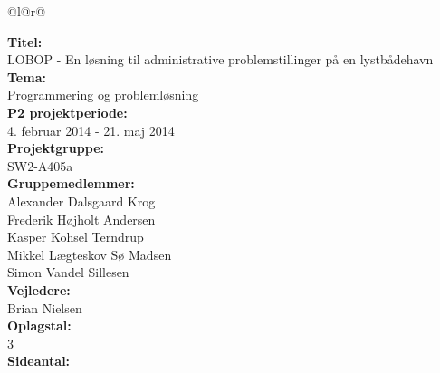 \pagestyle{titlepagestyle}

\newlength{\realparindent}
\newlength{\realparskip}
\setlength{\realparindent}{\parindent}
\setlength{\realparskip}{\parskip}

\begin{nopagebreak}
{\begin{center}
    \begin{tabular*}{\textwidth}{@{}l@{\extracolsep{\fill}}r@{}}
        \\
        \begin{minipage}[t]{0.49\textwidth}
            \textbf{Titel:}\\
            LOBOP - En løsning til administrative problemstillinger på en lystbådehavn\\

            \textbf{Tema:}\\
            Programmering og problemløsning\\

            \textbf{P2 projektperiode:}\\
            4. februar 2014 - 21. maj 2014\\

            \textbf{Projektgruppe:}\\
            SW2-A405a\\

            \textbf{Gruppemedlemmer:}\\
            Alexander Dalsgaard Krog\\
            Frederik Højholt Andersen\\
            Kasper Kohsel Terndrup\\
            Mikkel Lægteskov Sø Madsen\\
            Simon Vandel Sillesen\\

            \textbf{Vejledere:}\\
            Brian Nielsen\\

            \textbf{Oplagstal:}\\
            3\\

            \textbf{Sideantal:}\\
            \numberpages\\ 


\end{minipage}
\end{tabular*}
\end{center}}
\end{nopagebreak}
